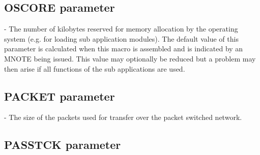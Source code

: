 \documentclass[letterpaper,10pt,english]{sphinxmanual}
\begin{document}

\subsection{OSCORE parameter}
\label{\detokenize{Installation_Guide:index-97}}\label{\detokenize{Installation_Guide:oscore-parameter}}
\begin{sphinxVerbatim}[commandchars=\\\{\}]
 
\end{sphinxVerbatim}

 - The number of kilobytes reserved for memory allocation by the operating system (e.g. for loading sub application modules). The default value of this parameter is calculated when this macro is assembled and is indicated by an MNOTE being issued. This value may optionally be reduced but a problem may then arise if all functions of the sub applications are used.


\subsection{PACKET parameter}
\label{\detokenize{Installation_Guide:packet-parameter}}\label{\detokenize{Installation_Guide:index-98}}
\begin{sphinxVerbatim}[commandchars=\\\{\}]
 
\end{sphinxVerbatim}

 - The size of the packets used for transfer over the packet switched network.
\label{\detokenize{Installation_Guide:virtvrrig-passtck}}

\subsection{PASSTCK parameter}
\label{\detokenize{Installation_Guide:passtck-parameter}}\label{\detokenize{Installation_Guide:index-99}}
\begin{sphinxVerbatim}[commandchars=\\\{\}]
 
\end{sphinxVerbatim}
\end{document}
